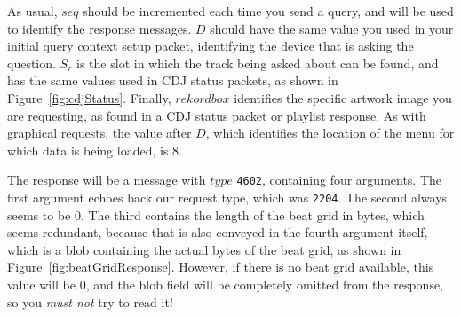 \documentclass[11pt]{article}
\begin{document}
As usual, $seq$ should be incremented each time you send a query, and
will be used to identify the response messages. $D$ should have the
same value you used in your initial query context setup packet,
identifying the device that is asking the question. $S_r$ is the slot
in which the track being asked about can be found, and has the same
values used in CDJ status packets, as shown in
Figure~\ref{fig:cdjStatus}. Finally, $rekordbox$ identifies the
specific artwork image you are requesting, as found in a CDJ status
packet or playlist response. As with graphical requests, the value
after $D$, which identifies the location of the menu for which data is
being loaded, is 8.

The response will be a message with $type$ {\tt 4602}, containing four
arguments. The first argument echoes back our request type, which was
{\tt 2204}. The second always seems to be 0. The third contains the
length of the beat grid in bytes, which seems redundant, because that
is also conveyed in the fourth argument itself, which is a blob
containing the actual bytes of the beat grid, as shown in
Figure~\ref{fig:beatGridResponse}. However, if there is no beat grid
available, this value will be 0, and the blob field will be completely
omitted from the response, so you \emph{must not} try to read it!
\end{document}
